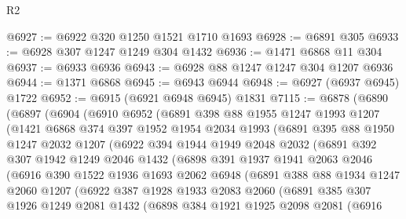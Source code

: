 \begin{lexlean}{R2}
\begin{coremodule}
@6927 := @6922 @320 @1250 @1521 @1710 @1693
@6928 := @6891 @305
@6933 := @6928 @307 @1247 @1249 @304 @1432
@6936 := @1471 @6868 @11 @304
@6937 := @6933 @6936
@6943 := @6928 @88 @1247 @1247 @304 @1207 @6936
@6944 := @1371 @6868
@6945 := @6943 @6944
@6948 := @6927 (@6937 @6945) @1722
@6952 := @6915 (@6921 @6948 @6945) @1831
@7115 := @6878
    (@6890
      (@6897
        (@6904
          (@6910
            @6952
            (@6891
              @398
              @88
              @1955
              @1247
              @1993
              @1207
              (@1421
                @6868
                @374
                @397
                @1952
                @1954
                @2034
                @1993
                (@6891
                  @395
                  @88
                  @1950
                  @1247
                  @2032
                  @1207
                  (@6922
                    @394
                    @1944
                    @1949
                    @2048
                    @2032
                    (@6891
                      @392
                      @307
                      @1942
                      @1249
                      @2046
                      @1432
                      (@6898
                        @391
                        @1937
                        @1941
                        @2063
                        @2046
                        (@6916
                          @390
                          @1522
                          @1936
                          @1693
                          @2062
                          @6948
                          (@6891
                            @388
                            @88
                            @1934
                            @1247
                            @2060
                            @1207
                            (@6922
                              @387
                              @1928
                              @1933
                              @2083
                              @2060
                              (@6891
                                @385
                                @307
                                @1926
                                @1249
                                @2081
                                @1432
                                (@6898
                                  @384
                                  @1921
                                  @1925
                                  @2098
                                  @2081
                                  (@6916

\end{coremodule}
\end{lexlean}
